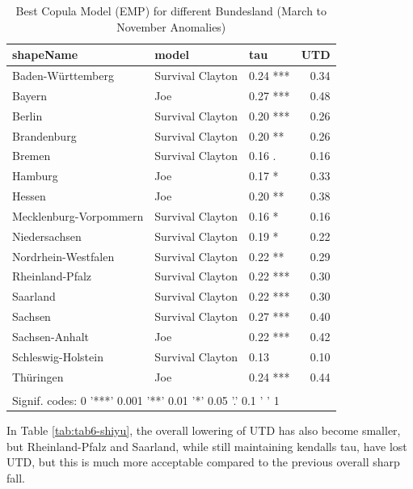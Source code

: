\documentclass[
]{krantz}
\begin{document}
\begin{table}

\caption{\label{tab:tab5-shiyu}Best Copula Model (EMP) for different Bundesland (March to November Anomalies)}
\centering
\begin{tabular}[t]{l|l|l|r}
\hline
shapeName & model & tau & UTD\\
\hline
Baden-Württemberg & Survival Clayton & 0.24 *** & 0.34\\
\hline
Bayern & Joe & 0.27 *** & 0.48\\
\hline
Berlin & Survival Clayton & 0.20 *** & 0.26\\
\hline
Brandenburg & Survival Clayton & 0.20 ** & 0.26\\
\hline
Bremen & Survival Clayton & 0.16 . & 0.16\\
\hline
Hamburg & Joe & 0.17 * & 0.33\\
\hline
Hessen & Joe & 0.20 ** & 0.38\\
\hline
Mecklenburg-Vorpommern & Survival Clayton & 0.16 * & 0.16\\
\hline
Niedersachsen & Survival Clayton & 0.19 * & 0.22\\
\hline
Nordrhein-Westfalen & Survival Clayton & 0.22 ** & 0.29\\
\hline
Rheinland-Pfalz & Survival Clayton & 0.22 *** & 0.30\\
\hline
Saarland & Survival Clayton & 0.22 *** & 0.30\\
\hline
Sachsen & Survival Clayton & 0.27 *** & 0.40\\
\hline
Sachsen-Anhalt & Joe & 0.22 *** & 0.42\\
\hline
Schleswig-Holstein & Survival Clayton & 0.13 & 0.10\\
\hline
Thüringen & Joe & 0.24 *** & 0.44\\
\hline
\multicolumn{4}{l}{\textsuperscript{} Signif. codes: 0 '***' 0.001 '**' 0.01 '*' 0.05 '.' 0.1 ' ' 1}\\
\end{tabular}
\end{table}

In Table \ref{tab:tab6-shiyu}, the overall lowering of UTD has also become smaller, but Rheinland-Pfalz and Saarland, while still maintaining kendalls tau, have lost UTD, but this is much more acceptable compared to the previous overall sharp fall.
\end{document}
